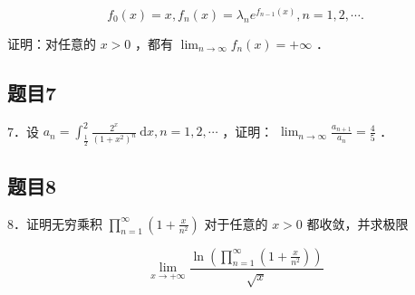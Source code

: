 \documentclass{article}
\begin{document}
\[
f_{0}(x)=x, f_{n}(x)=\lambda_{n} e^{f_{n-1}(x)}, n=1,2, \cdots .
\]

证明：对任意的 \(x>0\) ，都有 \(\lim _{n \rightarrow \infty} f_{n}(x)=+\infty\) ．

\subsection{题目7}
7．设 \(a_{n}=\int_{\frac{1}{2}}^{2} \frac{2^{x}}{\left(1+x^{2}\right)^{n}} \mathrm{~d} x, n=1,2, \cdots\) ，证明： \(\lim _{n \rightarrow \infty} \frac{a_{n+1}}{a_{n}}=\frac{4}{5}\) ．

\subsection{题目8}
8．证明无穷乘积 \(\prod_{n=1}^{\infty}\left(1+\frac{x}{n^{2}}\right)\) 对于任意的 \(x>0\) 都收敛，并求极限

\[
\lim _{x \rightarrow+\infty} \frac{\ln \left(\prod_{n=1}^{\infty}\left(1+\frac{x}{n^{2}}\right)\right)}{\sqrt{x}}
\]
\end{document}

